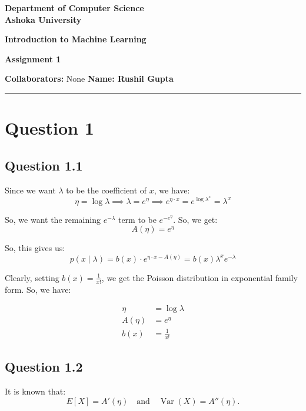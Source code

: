 \documentclass[a4paper]{article}
\begin{document}
\begin{center}
{\large \bf \color{red} Department of Computer Science} \\
{\large \bf \color{red} Ashoka University} \\

\vspace{0.1in}

{\large \bf \color{blue} Introduction to Machine Learning}

\vspace{0.05in}

{ \bf \color{YellowOrange} Assignment 1}
\end{center}
\medskip

{\textbf{Collaborators:} None} \hfill {\textbf{Name: Rushil Gupta} }

\bigskip
\hrule

\section*{Question 1}
\subsection*{Question 1.1}


Since we want $\lambda$ to be the coefficient of $x$, we have:
\[
\eta = \log \lambda \implies \lambda = e^\eta \implies e^{\eta \cdot x} = e ^{\log \lambda ^ x} = \lambda^x
\]

\noindent So, we want the remaining $e^{-\lambda}$ term to be $e^{-e^\eta}$. So, we get:
\[
A(\eta) = e^\eta
\]

\noindent So, this gives us:
\[
p(x \mid \lambda) = b(x) \cdot e^{\eta \cdot x - A(\eta)} = b(x) \lambda ^ {x} e ^ {- \lambda}
\]

\noindent Clearly, setting $b(x) = \frac{1}{x!}$, we get the Poisson distribution in exponential family form. So, we have:

\begin{align*}
    \eta &= \log \lambda \\
    A(\eta) &= e^\eta \\
    b(x) &= \frac{1}{x!}
\end{align*}

\bigskip
\subsection*{Question 1.2}

It is known that:
\[
E[X] = A'(\eta) \quad \text{and} \quad \operatorname{Var}(X) = A''(\eta).
\]
\end{document}
